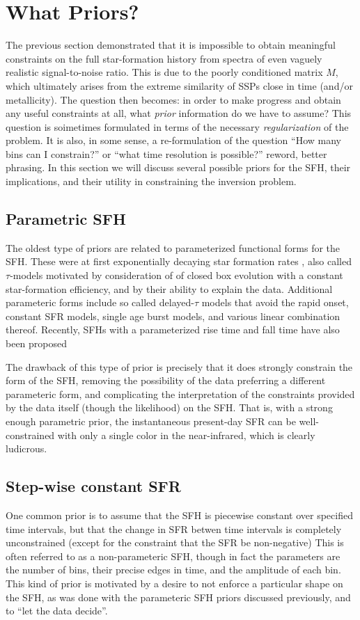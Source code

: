 \documentclass[iop,numberedappendix]{emulateapj}
\begin{document}
\section{What Priors?}
The previous section demonstrated that it is impossible to obtain meaningful constraints on the full star-formation history from spectra of even vaguely realistic signal-to-noise ratio.
This is due to the poorly conditioned matrix $M$, which ultimately arises from the extreme similarity of SSPs close in time (and/or metallicity).
The question then becomes: in order to make progress and obtain any useful constraints at all, what \emph{prior} information do we have to assume?
This question is soimetimes formulated in terms of the necessary \emph{regularization} of the problem.
It is also, in some sense, a re-formulation of the question ``How many bins can I constrain?'' or ``what time resolution is possible?'' {\color{blue} reword, better phrasing.}
In this section we will discuss several possible priors for the SFH, their implications, and their utility in constraining the inversion problem.

\subsection{Parametric SFH}
The oldest type of priors are related to parameterized functional forms for the SFH.  
These were at first exponentially decaying star formation rates \citep{tinsley}, also called $\tau$-models 
motivated by consideration of of closed box evolution with a constant star-formation efficiency, and by their ability to explain the data.
Additional parameteric forms include 
so called delayed-$\tau$ models that avoid the rapid onset,
constant SFR models,
single age burst models,
and various linear combination thereof.
Recently, SFHs with a parameterized rise time and fall time have also been proposed \citep{pacifici}

The drawback of this type of prior is precisely that it does strongly constrain the form of the SFH, removing the possibility of the data preferring a different parameteric form, and complicating the interpretation of the constraints provided by the data itself (though the likelihood) on the SFH.
That is, with a strong enough parametric prior, the instantaneous present-day SFR can be well-constrained with only a single color in the near-infrared, which is clearly ludicrous.

\subsection{Step-wise constant SFR}
One common prior is to assume that the SFH is piecewise constant over specified time intervals, but that the change in SFR betwen time intervals is completely unconstrained (except for the constraint that the SFR be non-negative)
This is often referred to as a non-parameteric SFH, though in fact the parameters are the number of bins, their precise edges in time, and the amplitude of each bin.
This kind of prior is motivated by a desire to not enforce a particular shape on the SFH, as was done with the parameteric SFH priors discussed previously, and to ``let the data decide''.
\end{document}
